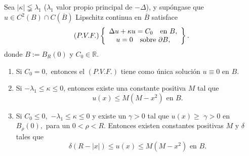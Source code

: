




\begin{theorem}
Sea $\left\vert \kappa\right\vert \lneqq\lambda_{1}$
($\lambda_{1}$ valor propio principal de $-\Delta$), y
sup\'{o}ngase que \linebreak $u\in C^{2}\left(  B\right)  \cap
C(\overline{B})$ Lipschitz continua en $\overline{B}$ satisface
\[
\left(  P.V.F.\right)  \left\{
\begin{array}
[c]{c}%
\Delta u+\kappa u=C_{0}\text{ \ \ en }B,\\
u=0\text{ \ \ sobre }\partial B,
\end{array}
\right\}.
\]
donde $B:=B_{R}\left(  0\right)  $ y $C_{0}\in\mathbb{R}.$

\begin{enumerate}
\item Si $C_{0}=0,$ entonces el $\left(  P.V.F.\right)  $ tiene como \'{u}nica
soluci\'{o}n $u\equiv0$ en $B.$

\item Si $-\lambda_{1}\leq\kappa\leq0$, entonces existe una constante positiva
$M$ tal que
\[
u\left(  x\right)  \leq M\left(  M-x^{2}\right)  \text{ \ \ en }B\text{.}%
\]


\item Si $C_{0}\leq0,$ $-\lambda_{1}\leq\kappa\leq0$ y existe un $\gamma>0$
tal que $u(x)\geq$ $\gamma>0$ en $B_{\rho}\left(  0\right)  ,$ para un
$0<\rho<R$. Entonces existen constantes positivas $M$ y $\delta$ tales que
\[
\delta\left(  R-\left\vert x\right\vert \right)  \leq u\left(  x\right)  \leq
M\left(  M-x^{2}\right)  \text{ \ \ en }B\text{.}%
\]

\end{enumerate}
\end{theorem}

